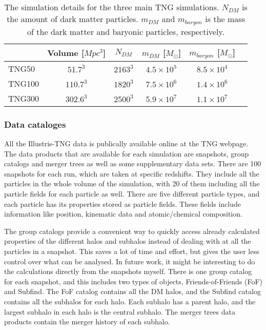 \begin{table}
\begin{center}
\begin{tabular}{ l| c c c c c } 
 \hline
 \hline
   &  Volume [$Mpc^3$] & $N_{DM}$ & $m_{DM}$ [$M_{\odot}$] & $m_{baryon}$ [$M_{\odot}$] \\
  \hline
 TNG50 & $51.7^3$ & $2163^3$ & $4.5 \times 10^5 $ & $8.5 \times 10^4 $ \\ 
 TNG100 & $110.7^3$ & $1820^3$ & $7.5 \times 10^6 $ & $1.4 \times 10^6 $  \\ 
 TNG300 & $302.6^3$ & $2500^3$ & $5.9 \times 10^7 $ & $1.1 \times 10^7 $  \\ 
 \hline 
 \end{tabular}
\end{center}
\caption{The simulation details for the three main TNG simulations. $N_{DM}$ is the amount of dark matter particles. $m_{DM}$ and $m_{baryon}$ is the mass of the dark matter and baryonic particles, respectively.}
 \label{TNG}
\end{table}

\subsubsection{Data cataloges}
All the Illustris-TNG data is publically available online at the TNG webpage. The data products that are available for each simulation are snapshots, group catalogs and merger trees as well as some supplementary data sets. There are 100 snapshots for each run, which are taken at specific redshifts. They include all the particles in the whole volume of the simulation, with 20 of them including all the particle fields for each particle as well. There are five different particle types, and each particle has its properties stored as particle fields. These fields include information like position, kinematic data and atomic/chemical composition. 


The group catalogs provide a convenient way to quickly access already calculated properties of the different halos and subhalos instead of dealing with at all the particles in a snapshot. This saves a lot of time and effort, but gives the user less control over what can be analysed. In future work, it might be interesting to do the calculations directly from the snapshots myself. There is one group catalog for each snapshot, and this includes two types of objects, Friends-of-Friends (FoF) and Subfind. The FoF catalog contains all the DM halos, and the Subfind catalog contains all the subhalos for each halo. Each subhalo has a parent halo, and the largest subhalo in each halo is the central subhalo. The merger trees data products contain the merger history of each subhalo.

